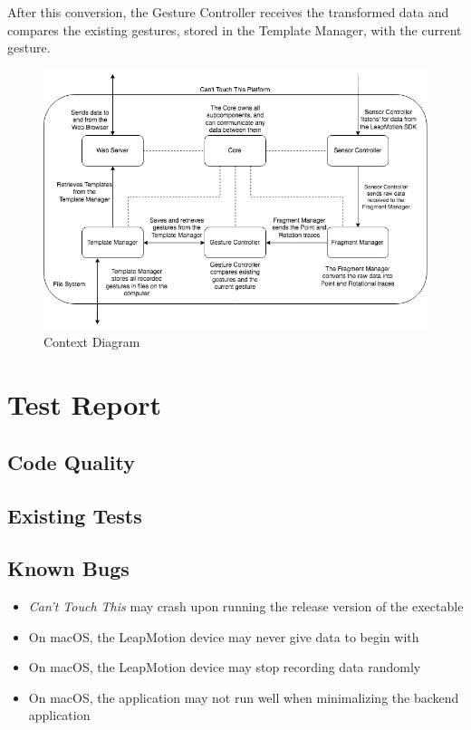 \documentclass[a4paper]{article}
\providecommand{\tightlist}{%
\setlength{\itemsep}{0pt}\setlength{\parskip}{0pt}}
\begin{document}
  After this conversion, the Gesture Controller receives the transformed data
  and compares the existing gestures, stored in the Template Manager, with the
  current gesture.
  \clearpage

  \begin{figure}[h]
    \caption{Context Diagram}
    \centering
    \includegraphics[width=\linewidth]{functional-diagram}
  \end{figure}
  \clearpage


  \section{Test Report}

  \subsection{Code Quality}

  \subsection{Existing Tests}

  \subsection{Known Bugs}
  \begin{itemize}
    \tightlist
    \item \textit{Can't Touch This} may crash upon running the release version
      of the exectable
    \item On macOS, the LeapMotion device may never give data to begin with
    \item On macOS, the LeapMotion device may stop recording data randomly
    \item On macOS, the application may not run well when minimalizing the
      backend application
  \end{itemize}
\end{document}
